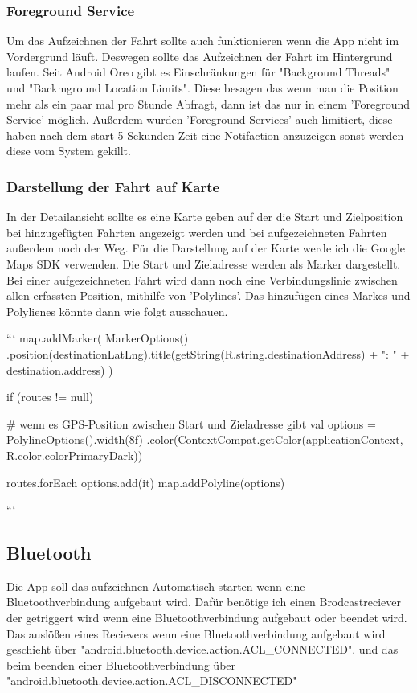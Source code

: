 \documentclass[a4paper]{article}
\begin{document}
\subsubsection{Foreground Service}
Um das Aufzeichnen der Fahrt sollte auch funktionieren wenn die App nicht im Vordergrund läuft.
Deswegen sollte das Aufzeichnen der Fahrt im Hintergrund laufen.
Seit Android Oreo gibt es Einschränkungen für "Background Threads" und "Backmground Location Limits". 
Diese besagen das wenn man die Position mehr als ein paar mal pro Stunde Abfragt, dann ist das nur in einem
'Foreground Service' möglich. Außerdem wurden 'Foreground Services' auch limitiert, diese haben nach dem start 5 Sekunden
Zeit eine Notifaction anzuzeigen sonst werden diese vom System gekillt.

\subsubsection{Darstellung der Fahrt auf Karte}
In der Detailansicht sollte es eine Karte geben auf der die Start und Zielposition bei hinzugefügten Fahrten angezeigt werden
und bei aufgezeichneten Fahrten außerdem noch der Weg. Für die Darstellung auf der Karte werde ich die Google Maps SDK verwenden.
Die Start und Zieladresse werden als Marker dargestellt. Bei einer aufgezeichneten Fahrt wird dann noch eine Verbindungslinie 
zwischen allen erfassten Position, mithilfe von 'Polylines'. 
Das hinzufügen eines Markes und Polylienes könnte dann wie folgt ausschauen.

```
map.addMarker(
	MarkerOptions()
		.position(destinationLatLng).title(getString(R.string.destinationAddress) + ": " + destination.address)
)

if (routes != null) {	# wenn es GPS-Position zwischen Start und Zieladresse gibt
	val options = PolylineOptions().width(8f)
		.color(ContextCompat.getColor(applicationContext, R.color.colorPrimaryDark))

	routes.forEach {
		options.add(it) 
	}
	map.addPolyline(options)
}
```


\subsection{Bluetooth}
Die App soll das aufzeichnen Automatisch starten wenn eine Bluetoothverbindung aufgebaut wird.
Dafür benötige ich einen Brodcastreciever der getriggert wird wenn eine Bluetoothverbindung aufgebaut oder beendet wird.
Das auslößen eines Recievers wenn eine Bluetoothverbindung aufgebaut wird geschieht über "android.bluetooth.device.action.ACL_CONNECTED".
und das beim beenden einer Bluetoothverbindung über "android.bluetooth.device.action.ACL_DISCONNECTED"  
\end{document}
